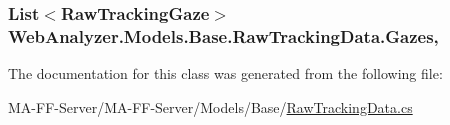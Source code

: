 \subsubsection[{Gazes}]{\setlength{\rightskip}{0pt plus 5cm}List$<${\bf Raw\+Tracking\+Gaze}$>$ Web\+Analyzer.\+Models.\+Base.\+Raw\+Tracking\+Data.\+Gazes\hspace{0.3cm}{\ttfamily [get]}, {\ttfamily [set]}}\label{class_web_analyzer_1_1_models_1_1_base_1_1_raw_tracking_data_a709969dfa88f800747d1bbabbdfb334e}


The documentation for this class was generated from the following file\+:\begin{DoxyCompactItemize}
\item 
M\+A-\/\+F\+F-\/\+Server/\+M\+A-\/\+F\+F-\/\+Server/\+Models/\+Base/\hyperlink{_raw_tracking_data_8cs}{Raw\+Tracking\+Data.\+cs}\end{DoxyCompactItemize}
